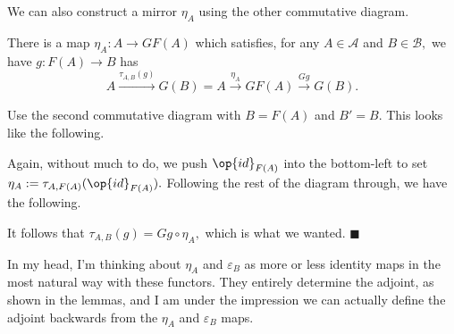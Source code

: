 We can also construct a mirror $\eta_A$ using the other commutative diagram.
\begin{lemma}
    There is a map $\eta_A:A\to GF(A)$ which satisfies, for any $A\in\mathcal A$ and $B\in\mathcal B,$ we have $g:F(A)\to B$ has
    \[A\stackrel{\tau_{A,B}(g)}\longrightarrow G(B)=A\stackrel{\eta_A}\longrightarrow GF(A)\stackrel{Gg}\longrightarrow G(B).\]
\end{lemma}
Use the second commutative diagram with $B=F(A)$ and $B'=B.$ This looks like the following.
\begin{center}
\end{center}
Again, without much to do, we push $\op{id}_{F(A)}$ into the bottom-left to set $\eta_A:=\tau_{A,F(A)}(\op{id}_{F(A)}).$ Following the rest of the diagram through, we have the following.
\begin{center}
\end{center}
It follows that $\tau_{A,B}(g)=Gg\circ\eta_A,$ which is what we wanted. $\blacksquare$

In my head, I'm thinking about $\eta_A$ and $\varepsilon_B$ as more or less identity maps in the most natural way with these functors. They entirely determine the adjoint, as shown in the lemmas, and I am under the impression we can actually define the adjoint backwards from the $\eta_A$ and $\varepsilon_B$ maps.

